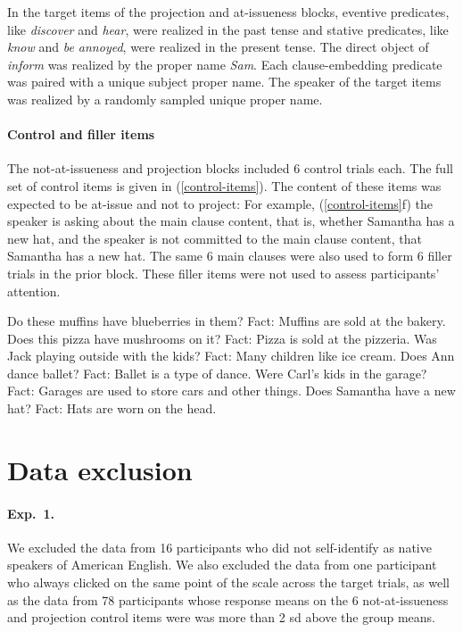 \documentclass[11pt,fleqn]{article}
\newcommand{\6}{\mbox{$[\hspace*{-.6mm}[$}}
\newcommand{\9}{\mbox{$]\hspace*{-.6mm}]$}}
\begin{document}
In the target items of the projection and at-issueness blocks, eventive predicates, like {\em discover} and {\em hear}, were realized in the past tense and stative predicates, like {\em know} and {\em be annoyed}, were realized in the present tense. The direct object of {\em inform} was realized by the proper name {\em Sam}. Each clause-embedding predicate was paired with a unique subject proper name. The speaker of the target items was realized by a randomly sampled unique proper name. 

\paragraph{Control and filler items} The not-at-issueness and projection blocks included 6 control trials each. The full set of control items is given in (\ref{control-items}). The content of these items was expected to be at-issue and not to project: For example, (\ref{control-items}f) the speaker is asking about the main clause content, that is, whether Samantha has a new hat, and the speaker is not committed to the main clause content, that Samantha has a new hat. The same 6 main clauses were also used to form 6 filler trials in the prior block. These filler items were not used to assess participants' attention. 

\begin{exe}
\ex\label{control-items}
\begin{xlist}
\ex Do these muffins have blueberries in them? Fact: Muffins are sold at the bakery. 
\ex Does this pizza have mushrooms on it? Fact: Pizza is sold at the pizzeria.
\ex Was Jack playing outside with the kids? Fact: Many children like ice cream.
\ex Does Ann dance ballet? Fact: Ballet is a type of dance.
\ex Were Carl's kids in the garage? Fact: Garages are used to store cars and other things.
\ex Does Samantha have a new hat? Fact: Hats are worn on the head.
\end{xlist}
\end{exe}

\section{Data exclusion}\label{a-excl}

\paragraph{Exp.~1.} We excluded the data from 16 participants who did not self-identify as native speakers of American English. We also excluded the data from one participant who always clicked on the same point of the scale across the target trials, as well as the data from 78 participants whose response means on the 6 not-at-issueness and projection control items were was more than 2 sd above the group means. 
\end{document}
